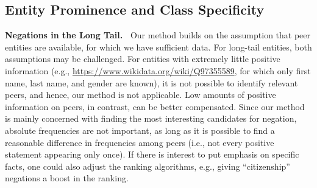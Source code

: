 \subsection{Entity Prominence and Class Specificity}

\noindent
\textbf{Negations in the Long Tail.\ }
Our method builds on the assumption that peer entities are available, 
for which we have sufficient data.
%
For long-tail entities, both assumptions may be challenged. For entities with extremely little positive information (e.g., \url{https://www.wikidata.org/wiki/Q97355589}, for which only first name, last name, and gender are known), it is not possible to identify relevant peers, and hence, our method is not applicable. Low amounts of positive information on peers, in contrast, can be better compensated.
Since our method is mainly concerned with finding the most interesting candidates for negation, absolute frequencies are not important, as long as it is possible to find a reasonable difference in frequencies among peers (i.e., not every positive statement appearing only once). If there is interest to put emphasis on specific facts, one could also 
adjust
the ranking algorithms, e.g., giving ``citizenship'' negations a 
boost in the ranking.



